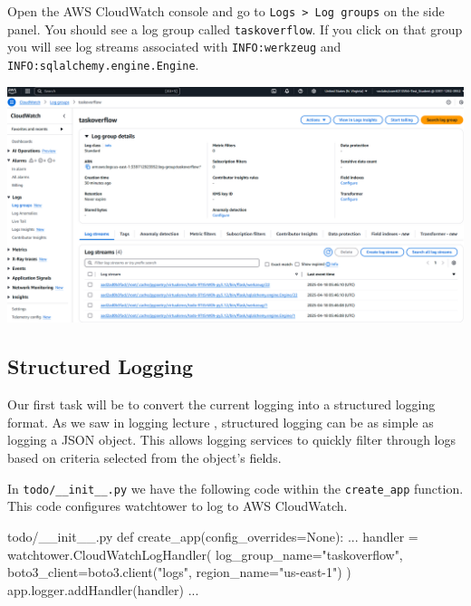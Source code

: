 \documentclass{csse4400}
\begin{document}
Open the AWS CloudWatch console and go to \texttt{Logs > Log groups} on the side panel.
You should see a log group called \texttt{taskoverflow}.
If you click on that group you will see log streams associated with \texttt{INFO:werkzeug}
and \texttt{INFO:sqlalchemy.engine.Engine}.

\begin{center}
\includegraphics[width=\textwidth]{images/log-group}
\end{center}

\subsection{Structured Logging}

Our first task will be to convert the current logging into a structured logging format.
As we saw in logging lecture \cite{logging-slides}, structured logging can be as simple as logging a JSON object.
This allows logging services to quickly filter through logs based on criteria selected from the object's fields.

In \texttt{todo/\_\_init\_\_.py} we have the following code within the \texttt{create\_app} function.
This code configures watchtower to log to AWS CloudWatch.
%
\begin{code}[language=python,numbers=none]{todo/\_\_init\_\_.py}
def create_app(config_overrides=None): 
    ...
    handler = watchtower.CloudWatchLogHandler(
        log_group_name="taskoverflow",
        boto3_client=boto3.client("logs", region_name="us-east-1")
    )
    app.logger.addHandler(handler)
    ...
\end{code}
\end{document}
